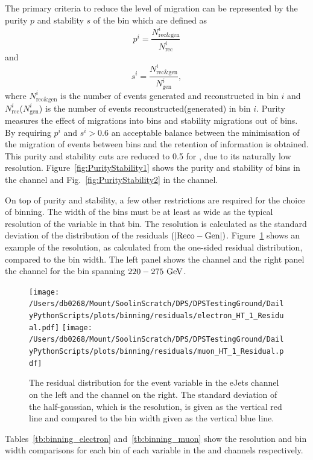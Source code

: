 The primary criteria to reduce the level of migration can be represented by the purity $p$ and stability $s$ of the bin which are defined as
\begin{equation*}
p^{i} = \frac{N^{i}_{\mathrm{rec\&gen}}}{N^{i}_{\mathrm{rec}}}
\end{equation*}
and
\begin{equation*}
s^{i} = \frac{N^{i}_{\mathrm{rec\&gen}}}{N^{i}_{\mathrm{gen}}},
\end{equation*}
where $N^{i}_{\mathrm{rec\&gen}}$ is the number of events generated and reconstructed in bin $i$ and $N^{i}_{\mathrm{rec}}$($N^{i}_{\mathrm{gen}}$) is the number of events reconstructed(generated) in bin $i$.  
Purity measures the effect of migrations into bins and stability migrations out of bins.
By requiring $p^{i}$ and $s^{i}>0.6$ an acceptable balance between the minimisation of the migration of events between bins and the retention of information is obtained.
This purity and stability cuts are reduced to 0.5 for \ptmiss{}, due to its naturally low resolution.
Figure~\ref{fig:PurityStability1} shows the purity and stability of bins in the \eJets{} channel and Fig.~\ref{fig:PurityStability2} in the \muJets{} channel.


On top of purity and stability, a few other restrictions are required for the choice of binning.
The width of the bins must be at least as wide as the typical resolution of the variable in that bin. 
The resolution is calculated as the standard deviation of the distribution of the residuals $(\lvert \mathrm{Reco}-\mathrm{Gen} \rvert)$.
Figure~\ref{fig:exampleRes} shows an example of the resolution, as calculated from the one-sided residual distribution, compared to the bin width.
The left panel shows the \eJets{} channel and the right panel the \muJets{} channel for the \HT{} bin spanning $220-275\mathrm{~Ge\hspace{-.08em}V}^{}$.
\begin{figure}[htpb]
	\centering
	\texttt{[image: /Users/db0268/Mount/SoolinScratch/DPS/DPSTestingGround/DailyPythonScripts/plots/binning/residuals/electron\_HT\_1\_Residual.pdf]}
	\texttt{[image: /Users/db0268/Mount/SoolinScratch/DPS/DPSTestingGround/DailyPythonScripts/plots/binning/residuals/muon\_HT\_1\_Residual.pdf]}
	\caption[The residual distribution for the \HT{} event variable in the eJets{} channel on the left and the \muJets{} channel on the right. The standard deviation of the half-gaussian, which is the resolution, is given as the vertical red line and compared to the bin width given as the vertical blue line.]{The residual distribution for the \HT{} event variable in the eJets{} channel on the left and the \muJets{} channel on the right. The standard deviation of the half-gaussian, which is the resolution, is given as the vertical red line and compared to the bin width given as the vertical blue line.}
	\label{fig:exampleRes}
\end{figure}
Tables~\ref{tb:binning_electron} and~\ref{tb:binning_muon} show the resolution and bin width comparisons for each bin of each variable in the \eJets{} and \muJets{} channels respectively.

